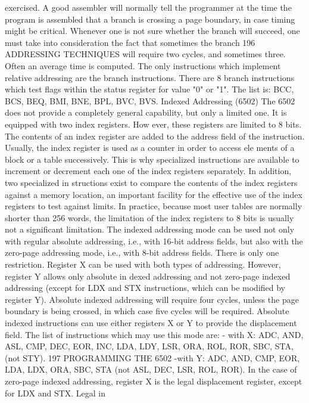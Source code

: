 \documentclass{book}
\begin{document}
exercised.
A good assembler will normally tell the programmer at the
time the program is assembled that a branch is crossing a page
boundary, in case timing might be critical.
Whenever one is not sure whether the branch will succeed, one
must take into consideration the fact that sometimes the branch
196
ADDRESSING TECHNIQUES
will require two cycles, and sometimes three. Often an average
time is computed.
The only instructions which implement relative addressing are the
branch instructions. There are 8 branch instructions which test flags
within the status register for value "0" or "1". The list is: BCC,
BCS, BEQ, BMI, BNE, BPL, BVC, BVS.
Indexed Addressing (6502)
The 6502 does not provide a completely general capability, but
only a limited one. It is equipped with two index registers. How
ever, these registers are limited to 8 bits. The contents of an index
register are added to the address field of the instruction. Usually,
the index register is used as a counter in order to access ele
ments of a block or a table successively. This is why specialized
instructions are available to increment or decrement each one of
the index registers separately. In addition, two specialized in
structions exist to compare the contents of the index registers
against a memory location, an important facility for the effective
use of the index registers to test against limits.
In practice, because most user tables are normally shorter than
256 words, the limitation of the index registers to 8 bits is usually
not a significant limitation.
The indexed addressing mode can be used not only with regular
absolute addressing, i.e., with 16-bit address fields, but also with
the zero-page addressing mode, i.e., with 8-bit address fields.
There is only one restriction. Register X can be used with both
types of addressing. However, register Y allows only absolute in
dexed addressing and not zero-page indexed addressing (except for
LDX and STX instructions, which can be modified by register Y).
Absolute indexed addressing will require four cycles, unless the
page boundary is being crossed, in which case five cycles will be
required.
Absolute indexed instructions can use either registers X or Y to
provide the displacement field. The list of instructions which may
use this mode are:
- with X: ADC, AND, ASL, CMP, DEC, EOR, INC, LDA, LDY,
LSR, ORA, ROL, ROR, SBC, STA, (not STY).
197
PROGRAMMING THE 6502
-with Y: ADC, AND, CMP, EOR, LDA, LDX, ORA, SBC, STA
(not ASL, DEC, LSR, ROL, ROR).
In the case of zero-page indexed addressing, register X is the
legal displacement register, except for LDX and STX. Legal in
\end{document}
